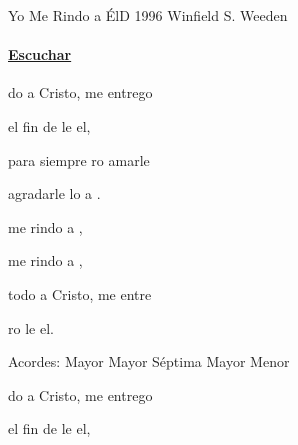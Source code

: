 \documentclass[12pt, spanish]{book}
\begin{document}
    \begin{song}{Yo Me Rindo a Él}{D}
        {1996} %
        {Winfield S. Weeden}
        {} %
        {}
        \ifChordBk
        \paragraph{\mbox{}\hfill\protect\href{https://open.spotify.com/intl-es/track/1wohJA29EsoRgndrml9EjF}{Escuchar}\mbox{}\hfill}
        \fi


        \begin{SBOpGroup}
            do a Cristo,  me entrego

             el fin de le el,

            para siempre ro amarle

             agradarle lo a .
        \end{SBOpGroup}

        \begin{SBChorus}
             me rindo a ,

             me rindo a ,

            todo a Cristo,  me entre

            ro le el.
        \end{SBChorus}

        \ifChordBk
        \begin{SBOpGroup}
            Acordes:\break
             Mayor \hfill
             Mayor S\'eptima \hfill\null\break
             Mayor \hfill
             Menor \hfill\null\break
        \end{SBOpGroup}
        \fi
        \clearpage

        \begin{SBExtraKeys}{

            \begin{SBOpGroup}
                do a Cristo,  me entrego

                 el fin de le el,


\end{SBOpGroup}}
\end{SBExtraKeys}
\end{song}
\end{document}
